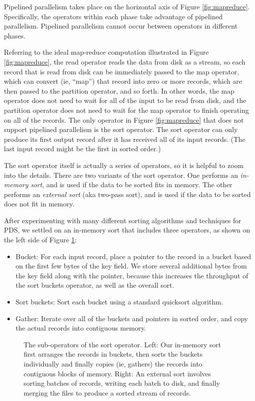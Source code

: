\documentclass[ 11pt, letterpaper]{article}%
\begin{document}
Pipelined parallelism takes place on the horizontal axis of Figure
\ref{fig:mapreduce}. Specifically, the operators within each phase take
advantage of pipelined parallelism. Pipelined parallelism cannot occur
between operators in different phases.

Referring to the ideal map-reduce computation illustrated in Figure \ref{fig:mapreduce}, the read
operator reads the data from
disk as a stream, so each record that is read from disk can be immediately
passed to the map operator, which can convert (ie, ``map'') that record into
zero or more records, which are then passed to the partition operator, and so
forth. In other words, the map operator does not need to wait for all of the
input to be read from disk, and the partition operator does not need to wait
for the map operator to finish operating on all of the records. The only
operator in Figure \ref{fig:mapreduce} that does not support pipelined
parallelism is the sort operator. The sort operator can only produce its first
output record after it has received all of its input records. (The last input
record might be the first in sorted order.)

The sort operator itself is actually a series of operators, so it is helpful to
zoom into the details. There are two variants of the sort operator. One
performs an \emph{in-memory sort}, and is used if the data to be sorted fits in
memory. The other performs an \emph{external sort} (aka two-pass sort), and is
used if the data to be sorted does not fit in memory.

After experimenting with many different sorting algorithms and techniques for
PDS, we settled on an in-memory sort that includes three
operators, as shown on the left side of Figure \ref{fig:sort}:
\begin{itemize}
  \item Bucket: For each input record, place a pointer to the record in a
  bucket based on the first few bytes of the key field. We store several
  additional bytes from the key field along with the pointer, because this
  increases the throughput of the sort buckets operator, as well as the overall
  sort.
  \item Sort buckets: Sort each bucket using a standard quicksort algorithm.
  \item Gather: Iterate over all of the buckets and pointers in sorted order,
  and copy the actual records into contiguous memory.
\end{itemize}

\begin{figure}
\begin{center}
\caption{The sub-operators of the sort operator. Left: Our in-memory sort first arranges the records in buckets, then sorts the buckets individually and finally copies (ie, gathers) the records into contiguous blocks of memory. Right: An external sort involves sorting batches of records, writing each batch to disk, and finally merging the files to produce a sorted stream of records.}
\label{fig:sort}
\end{center}
\end{figure}
\end{document}
